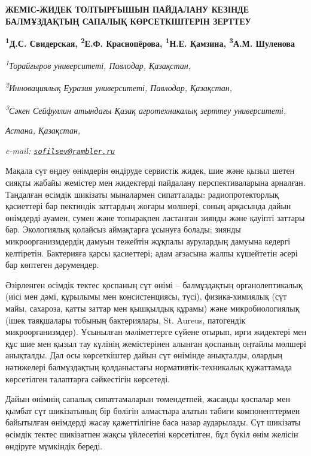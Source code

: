 {{{\bfseries ЖЕМІС-ЖИДЕК ТОЛТЫРҒЫШЫН ПАЙДАЛАНУ КЕЗІНДЕ БАЛМҰЗДАҚТЫҢ САПАЛЫҚ
КӨРСЕТКІШТЕРІН ЗЕРТТЕУ}

{\bfseries \textsuperscript{1}Д.С. Свидерская\textsuperscript{\envelope },
\textsuperscript{2}Е.Ф. Краснопёрова, \textsuperscript{1}Н.Е. Қамзина,
\textsuperscript{3}А.М. Шуленова}

\emph{\textsuperscript{1}Торайғыров университеті, Павлодар, Қазақстан,}

\emph{\textsuperscript{2}Инновациялық Еуразия университеті, Павлодар,
Қазақстан,}

\emph{\textsuperscript{3}Сәкен Сейфуллин атындағы Қазақ агротехникалық
зерттеу университеті,}

\emph{Астана, Қазақстан,}

\emph{e-mail:
\href{mailto:sofilsev@rambler.ru}{\nolinkurl{sofilsev@rambler.ru}}}

Мақала сүт өңдеу өнімдерін өндіруде сервистік жидек, шие және қызыл
шетен сияқты жабайы жемістер мен жидектерді пайдалану перспективаларына
арналған. Таңдалған өсімдік шикізаты мыналармен сипатталады:
радиопротекторлық қасиеттері бар пектиндік заттардың жоғары мөлшері,
соның арқасында дайын өнімдерді ауамен, сумен және топырақпен ластанған
зиянды және қауіпті заттары бар. Экологиялық қолайсыз аймақтарға ұсынуға
болады; зиянды микроорганизмдердің дамуын тежейтін жұқпалы аурулардың
дамуына кедергі келтіретін. Бактерияға қарсы қасиеттері; адам ағзасына
жалпы күшейтетін әсері бар көптеген дәрумендер.

Әзірленген өсімдік тектес қоспаның сүт өнімі -- балмұздақтың
органолептикалық (иісі мен дәмі, құрылымы мен консистенциясы, түсі),
физика-химиялық (сүт майы, сахароза, қатты заттар мен қышқылдық құрамы)
және микробиологиялық (ішек таяқшалары тобының бактериялары, St. Aureus,
патогендік микроорганизмдер). Ұсынылған мәліметтерге сүйене отырып, ирги
жидектері мен құс шие мен қызыл тау күлінің жемістерінен алынған
қоспаның оңтайлы мөлшері анықталды. Дәл осы көрсеткіштер дайын сүт
өнімінде анықталды, олардың нәтижелері балмұздақтың қолданыстағы
нормативтік-техникалық құжаттамада көрсетілген талаптарға сәйкестігін
көрсетеді.

Дайын өнімнің сапалық сипаттамаларын төмендетпей, жасанды қоспалар мен
қымбат сүт шикізатының бір бөлігін алмастыра алатын табиғи
компоненттермен байытылған өнімдерді жасау қажеттілігіне баса назар
аударылады. Сүт шикізаты өсімдік тектес шикізатпен жақсы үйлесетіні
көрсетілген, бұл бүкіл өнім желісін өндіруге мүмкіндік береді.

}}
